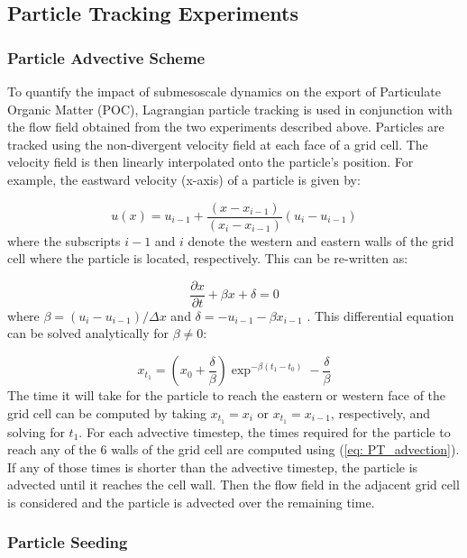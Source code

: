 \documentclass[draft,linenumbers]{agujournal2018}
\begin{document}
\subsection{Particle Tracking Experiments}

\subsubsection{Particle Advective Scheme}
To quantify the impact of submesoscale dynamics on the export of Particulate Organic Matter (POC), Lagrangian particle tracking is used in conjunction with the flow field obtained from the two experiments described above. Particles are tracked using the non-divergent velocity field at each face of a grid cell. The velocity field is then linearly interpolated onto the particle's position. For example, the eastward velocity (x-axis) of a particle is given by:

\begin{equation}
u(x) = u_{i-1} + \frac{(x - x_{i-1})}{(x_i - x_{i-1})}(u_{i}-u_{i-1})
\end{equation}
where the subscripts $i-1$ and $i$ denote the western and eastern walls of the grid cell where the particle is located, respectively. This can be re-written as:

\begin{equation}
\frac{\partial x}{\partial t} + \beta x + \delta =  0
\label{eq: eq_diff}
\end{equation}
where $\beta = (u_{i}-u_{i-1})/\Delta x$ and $\delta = -u_{i-1} - \beta x_{i-1}$ \citep{Doos_2013}. This differential equation can be solved analytically for $\beta \neq 0$:

\begin{equation}
x_{t_1} = \left(x_0 + \frac{\delta}{\beta}\right)\exp^{-\beta(t_1 - t_0)} - \frac{\delta}{\beta}
\label{eq: PT_advection}
\end{equation}
The time it will take for the particle to reach the eastern or western face of the grid cell can be computed by taking $x_{t_1} = x_i$ or $x_{t_1} = x_{i-1}$, respectively, and solving for $t_1$. For each advective timestep, the times required for the particle to reach any of the 6 walls of the grid cell are computed using (\ref{eq: PT_advection}). If any of those times is shorter than the advective timestep, the particle is advected until it reaches the cell wall. Then the flow field in the adjacent grid cell is considered and the particle is advected over the remaining time. 

\subsubsection{Particle Seeding}
\end{document}
